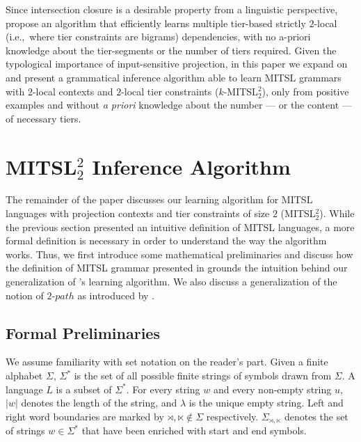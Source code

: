 \documentclass[11pt,a4paper]{article}
\begin{document}
Since intersection closure is a desirable property from a linguistic perspective, \citet{McMullinSCIL2019} propose an algorithm that efficiently learns multiple tier-based strictly $2$-local  (i.e.,~where tier constraints are bigrams) dependencies, with no a-priori knowledge about the tier-segments or the number of tiers required.
Given the typological importance of input-sensitive projection, in this paper we expand on \citet{McMullinSCIL2019} and present a grammatical inference algorithm able to learn MITSL grammars with $2$-local contexts and $2$-local tier constraints ($k$-MITSL$^2_2$), only from positive examples and without \emph{a priori} knowledge about the number --- or the content --- of necessary tiers.

\section{MITSL$^2_2$ Inference Algorithm}

The remainder of the paper discusses our learning algorithm for MITSL languages with projection contexts and tier constraints of size $2$ (MITSL$^2_2$).
While the previous section presented an intuitive definition of MITSL languages, a more formal definition is necessary in order to understand the way the algorithm works.
Thus, we first introduce some mathematical preliminaries and discuss how the definition of MITSL grammar presented in \citep{desanto2019structure}  grounds the intuition behind our generalization of \citet{McMullinSCIL2019}'s learning algorithm. 
We also discuss a generalization of the notion of  $2\text{-}path$ as introduced by \citet{JardineHeinz16}.


\subsection{Formal Preliminaries}

We assume familiarity with set notation on the reader's part.
Given a finite alphabet $\Sigma$, $\Sigma^*$ is the set of all possible finite strings of symbols drawn from $\Sigma$.
A language $L$ is a subset of $\Sigma^*$.
For every string $w$ and every non-empty string $u$, $|w|$ denotes the length of the string, and $\lambda$ is the unique empty string.
Left and right word boundaries are marked by  $\rtimes, \ltimes \notin \Sigma$ respectively.
 $\Sigma_{\rtimes, \ltimes }$ denotes the set of strings $w \in \Sigma^*$ that have been enriched with start and end symbols.
\end{document}
